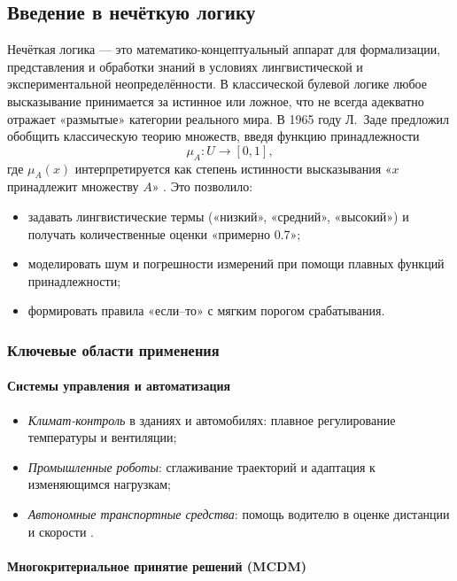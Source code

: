 \subsection{Введение в нечёткую логику}
Нечёткая логика --- это математико-концептуальный аппарат для формализации, представления и обработки знаний в условиях лингвистической и экспериментальной неопределённости. В классической булевой логике любое высказывание принимается за истинное или ложное, что не всегда адекватно отражает «размытые» категории реального мира. В 1965 году Л.~Заде предложил обобщить классическую теорию множеств, введя функцию принадлежности
\[
  \mu_A: U \to [0,1],
\]
где \(\mu_A(x)\) интерпретируется как степень истинности высказывания «\(x\) принадлежит множеству \(A\)» \cite{Zadeh1965}. Это позволило:
\begin{itemize}
  \item задавать лингвистические термы («низкий», «средний», «высокий») и получать количественные оценки «примерно 0.7»;
  \item моделировать шум и погрешности измерений при помощи плавных функций принадлежности;
  \item формировать правила «если–то» с мягким порогом срабатывания.
\end{itemize}


\subsubsection{Ключевые области применения}
\label{subsec:applications}

\paragraph{Системы управления и автоматизация}
\begin{itemize}
  \item \emph{Климат-контроль} в зданиях и автомобилях: плавное регулирование температуры и вентиляции;
  \item \emph{Промышленные роботы}: сглаживание траекторий и адаптация к изменяющимся нагрузкам;
  \item \emph{Автономные транспортные средства}: помощь водителю в оценке дистанции и скорости \cite{Ross2004}.
\end{itemize}

\paragraph{Многокритериальное принятие решений (MCDM)}

